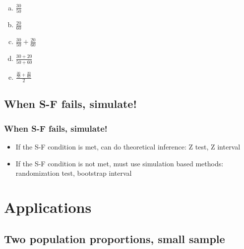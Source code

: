 \documentclass[11pt,containsverbatim,handout,xcolor=xelatex,dvipsnames,table]{beamer}
\newcommand{\solnMult}[1]{#1}
\begin{document}
\begin{frame}
\frametitle{}


\begin{enumerate}[(a)]
\item $\frac{30}{50}$
\item $\frac{20}{60}$
\item $\frac{30}{50} + \frac{20}{60}$
\item \solnMult{$\frac{30 + 20}{50 + 60}$}
\item $\frac{\frac{30}{50} + \frac{20}{60}}{2}$
\end{enumerate}

\end{frame}


\subsection{When S-F fails, simulate!}
\label{mi3}


\begin{frame}
\frametitle{When S-F fails, simulate!}

\begin{itemize}

\item If the S-F condition is met, can do theoretical inference: Z test, Z interval

\item If the S-F condition is not met, must use simulation based methods: randomization test, bootstrap interval

\end{itemize}

\end{frame}


\section{Applications}


\subsection{Two population proportions, small sample}
\end{document}
